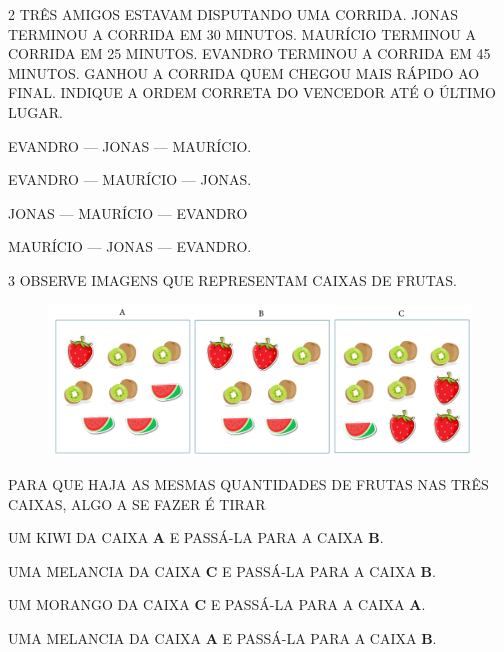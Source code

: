 \num{2} TRÊS AMIGOS ESTAVAM DISPUTANDO UMA CORRIDA. JONAS TERMINOU A CORRIDA EM 30
MINUTOS. MAURÍCIO TERMINOU A CORRIDA EM 25 MINUTOS. EVANDRO TERMINOU A
CORRIDA EM 45 MINUTOS. GANHOU A CORRIDA QUEM CHEGOU MAIS RÁPIDO AO FINAL. INDIQUE A
ORDEM CORRETA DO VENCEDOR ATÉ O ÚLTIMO LUGAR.

\begin{escolha}[itemsep=0pt]
\item EVANDRO --- JONAS --- MAURÍCIO.

\item EVANDRO --- MAURÍCIO --- JONAS.

\item JONAS --- MAURÍCIO --- EVANDRO

\item MAURÍCIO --- JONAS --- EVANDRO.
\end{escolha}

\num{3} OBSERVE IMAGENS QUE REPRESENTAM CAIXAS DE FRUTAS.

\begin{figure}[H]
\centering
\includegraphics[width=\textwidth]{./media/SAEB_1ANO_MAT_FIGURA137.png}
\end{figure}

PARA QUE HAJA AS MESMAS QUANTIDADES DE FRUTAS NAS TRÊS CAIXAS, ALGO
A SE FAZER É TIRAR

\begin{escolha}[itemsep=0pt]
\item UM KIWI DA CAIXA \textbf{A} E PASSÁ-LA PARA A CAIXA \textbf{B}.

\item UMA MELANCIA DA CAIXA \textbf{C} E PASSÁ-LA PARA A CAIXA \textbf{B}.

\item UM MORANGO DA CAIXA \textbf{C} E PASSÁ-LA PARA A CAIXA \textbf{A}.

\item UMA MELANCIA DA CAIXA \textbf{A} E PASSÁ-LA PARA A CAIXA \textbf{B}.
\end{escolha}

